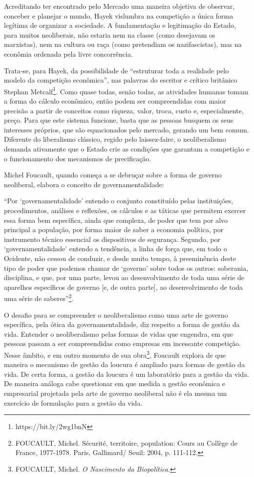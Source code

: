 Acreditando ter encontrado pelo Mercado uma maneira objetiva de
observar, conceber e planejar o mundo, Hayek vislumbra na competição a
única forma legítima de organizar a sociedade. A fundamentação e
legitimação do Estado, para muitos neoliberais, não estaria nem na
classe (como desejavam os marxistas), nem na cultura ou raça (como
pretendiam os nazifascistas), mas na econômia ordenada pela livre
concorrência.

Trata-se, para Hayek, da possibilidade de ``estruturar toda a realidade
pelo modelo da competição econômica'', nas palavras do escritor e
crítico britânico Stephan Metcalf\footnote{https://bit.ly/2wg1bnN}.
Como quase todas, senão todas, as atividades humanas tomam a forma do
cálculo econômico, então podem ser compreendidas com maior precisão a
partir de conceitos como riqueza, valor, troca, custo e, especialmente,
preço. Para que este sistema funcione, basta que as pessoas busquem os
seus interesses próprios, que são equacionados pelo mercado, gerando um
bem comum. Diferente do liberalismo clássico, regido pelo laissez-faire,
o neoliberalismo demanda ativamente que o Estado crie as condições que
garantam a competição e o funcionamento dos mecanismos de precificação.

Michel Foucault, quando começa a se debruçar sobre a forma de governo
neoliberal, elabora o conceito de governamentalidade:

``Por `governamentalidade' entendo o conjunto constituído pelas
instituições, procedimentos, análises e reﬂexões, os cálculos e as
táticas que permitem exercer essa forma bem especíﬁca, ainda que
complexa, de poder que tem por alvo principal a população, por forma
maior de saber a economia política, por instrumento técnico essencial os
dispositivos de segurança. Segundo, por `governamentalidade' entendo a
tendência, a linha de força que, em todo o Ocidente, não cessou de
conduzir, e desde muito tempo, à preeminência deste tipo de poder que
podemos chamar de `governo' sobre todos os outros: soberania,
disciplina, e que, por uma parte, levou ao desenvolvimento de toda uma
série de aparelhos especíﬁcos de governo {[}e, de outra parte{]}, ao
desenvolvimento de toda uma série de saberes''\footnote{FOUCAULT,
  Michel. Sécurité, territoire, population: Cours au Collège de France,
  1977-1978. Paris, Gallimard/ Seuil: 2004, p. 111-112.}.

O desafio para se compreender o neoliberalismo como uma arte de governo
específica, pela ótica da governamentalidade, diz respeito a forma de
gestão da vida. Entender o neoliberalismo pelas formas de vidas que
engendra, em que pessoas passam a ser compreendidas como empresas em
incessante competição. Nesse âmbito, e em outro momento de sua
obra\footnote{FOUCAULT, Michel. \emph{O Nascimento da Biopolítica}.},
Foucault explora de que maneira o mecanismo de gestão da loucura é
ampliado para formas de gestão da vida. De certa forma, a gestão da
loucura é um laboratório para a gestão da vida. De maneira análoga cabe
questionar em que medida a gestão econômica e empresarial projetada pela
arte de governo neoliberal não é ela mesma um exercício de formulação
para a gestão da vida.

